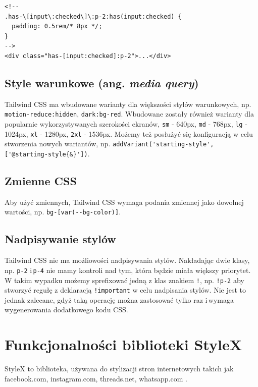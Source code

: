 \documentclass[a4paper,12pt]{book} %
\begin{document}
\begin{lstfloat}[hb]
  \lstset{language=HTML}
  \begin{lstlisting}[frame=single]
<!--
.has-\[input\:checked\]\:p-2:has(input:checked) {
  padding: 0.5rem/* 8px */;
}
-->
<div class="has-[input:checked]:p-2">...</div>
\end{lstlisting}
  \caption{Przykład użycia funkcyjnej pseudo-klasy w Tailwind CSS}\label{tailwind_fn}
\end{lstfloat}

\section{Style warunkowe (ang. \emph{media query})}
Tailwind CSS ma wbudowane warianty dla większości stylów warunkowych, np. \lstinline|motion-reduce:hidden|, \lstinline|dark:bg-red|. Wbudowane zostały również warianty dla popularnie wykorzystywanych szerokości ekranów, \lstinline|sm| - 640px, \lstinline|md| - 768px, \lstinline|lg| - 1024px, \lstinline|xl| - 1280px, \lstinline|2xl| - 1536px.  Możemy też posłużyć się konfiguracją w celu stworzenia nowych wariantów, np. \lstinline|addVariant('starting-style', ['@starting-style{&}'])|.

\section{Zmienne CSS}
Aby użyć zmiennych, Tailwind CSS wymaga podania zmiennej jako dowolnej wartości, np. \lstinline|bg-[var(--bg-color)]|.

\section{Nadpisywanie stylów}
Tailwind CSS nie ma możliowości nadpisywania stylów. Nakładając dwie klasy, np. \lstinline|p-2| i\,\lstinline|p-4| nie mamy kontroli nad tym, która będzie miała większy priorytet. W takim wypadku możemy sprefixować jedną z klas znakiem \lstinline|!|, np. \lstinline|!p-2| aby stworzyć regułę z deklaracją \lstinline|!important| w celu nadpisania stylów. Nie jest to jednak zalecane, gdyż taką operację można zastosować tylko raz i\,wymaga wygenerowania dodatkowego kodu CSS.
\chapter{Funkcjonalności biblioteki StyleX}
StyleX to biblioteka, używana do stylizacji stron internetowych takich jak facebook.com, instagram.com, threads.net, whatsapp.com \cite{StyleX}.
\end{document}
